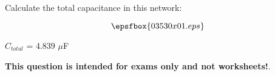 

Calculate the total capacitance in this network:

$$\epsfbox{03530x01.eps}$$







$C_{total}$ = 4.839 $\mu$F







{\bf This question is intended for exams only and not worksheets!}.



